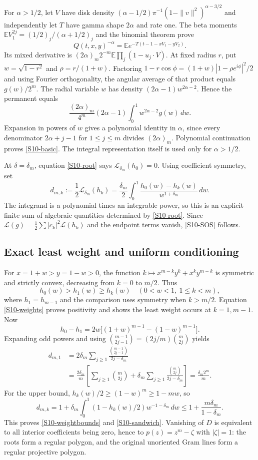\documentclass[11pt,a4paper]{article}
\theoremstyle{definition}\newtheorem{definition}[theorem]{Definition}
\theoremstyle{remark}\newtheorem{remark}[theorem]{Remark}
\numberwithin{equation}{section}
\begin{document}
For $\alpha>1/2$, let $V$ have disk density $(\alpha-1/2)\pi^{-1}(1-\|v\|^2)^{\alpha-3/2}$ and independently let $T$ have gamma shape $2\alpha$ and rate one. The beta moments
$\mathbb E V_1^{2j}=(1/2)_j/(\alpha+1/2)_j$
and the binomial theorem prove
\[
 Q(t,x,y)^{-\alpha}=\mathbb E e^{-T(t-1-xV_1-yV_2)}.
\]
Its mixed derivative is $(2\alpha)_m2^{-m}\mathbb E\prod_j(1-u_j\cdot V)$. At fixed radius $r$, put $w=\sqrt{1-r^2}$ and $\rho=r/(1+w)$. Factoring
$1-r\cos\phi=(1+w)|1-\rho e^{i\phi}|^2/2$
and using Fourier orthogonality, the angular average of that product equals $g(w)/2^m$. The radial variable $w$ has density $(2\alpha-1)w^{2\alpha-2}$. Hence the permanent equals
\[
 \frac{(2\alpha)_m}{4^m}(2\alpha-1)\int_0^1w^{2\alpha-2}g(w)\,dw.
\]
Expansion in powers of $w$ gives a polynomial identity in $\alpha$, since every denominator $2\alpha+j-1$ for $1\le j\le m$ divides $(2\alpha)_m$. Polynomial continuation proves \eqref{S10-basic}. The integral representation itself is used only for $\alpha>1/2$.

At $\delta=\delta_m$, equation \eqref{S10-root} says $\mathcal L_{\delta_m}(h_0)=0$. Using coefficient symmetry, set
\begin{equation}\label{S10-weights}
 d_{m,k}:=\frac12\mathcal L_{\delta_m}(h_k)
 =\frac{\delta_m}{2}\int_0^1
 \frac{h_0(w)-h_k(w)}{w^{1+\delta_m}}\,dw.
\end{equation}
The integrand is a polynomial times an integrable power, so this is an explicit finite sum of algebraic quantities determined by \eqref{S10-root}. Since $\mathcal L(g)=\tfrac12\sum|c_k|^2\mathcal L(h_k)$ and the endpoint terms vanish, \eqref{S10-SOS} follows.

\subsection{Exact least weight and uniform conditioning}\label{S10-sec-3}
For $x=1+w>y=1-w>0$, the function
$k\mapsto x^{m-k}y^k+x^ky^{m-k}$
is symmetric and strictly convex, decreasing from $k=0$ to $m/2$. Thus
\[
 h_0(w)>h_1(w)\ge h_k(w)\quad(0<w<1,\ 1\le k<m),
\]
where $h_1=h_{m-1}$ and the comparison uses symmetry when $k>m/2$. Equation \eqref{S10-weights} proves positivity and shows the least weight occurs at $k=1,m-1$.
Now
\[
 h_0-h_1=2w\bigl[(1+w)^{m-1}-(1-w)^{m-1}\bigr].
\]
Expanding odd powers and using $\binom{m-1}{2j-1}=(2j/m)\binom m{2j}$ yields
\begin{align*}
 d_{m,1}
 &=2\delta_m\sum_{j\ge1}\frac{\binom{m-1}{2j-1}}{2j-\delta_m}\\
 &=\frac{2\delta_m}{m}
   \left[\sum_{j\ge1}\binom m{2j}
       +\delta_m\sum_{j\ge1}\frac{\binom m{2j}}{2j-\delta_m}\right]
 =\frac{\delta_m2^m}{m}.
\end{align*}
For the upper bound, $h_k(w)/2\ge(1-w)^m\ge1-mw$, so
\[
 d_{m,k}=1+\delta_m\int_0^1(1-h_k(w)/2)w^{-1-\delta_m}\,dw
 \le1+\frac{m\delta_m}{1-\delta_m}.
\]
This proves \eqref{S10-weightbounds} and \eqref{S10-sandwich}. Vanishing of $D$ is equivalent to all interior coefficients being zero, hence to $p(z)=z^m-\zeta$ with $|\zeta|=1$: the roots form a regular polygon, and the original unoriented Gram lines form a regular projective polygon.
\end{document}
